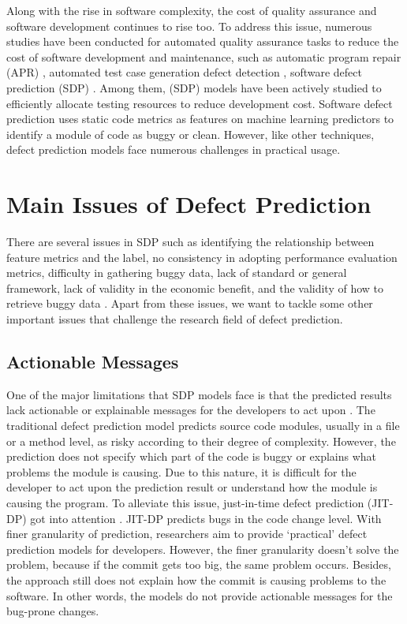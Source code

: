 Along with the rise in software complexity, the cost of quality assurance and software development continues to rise too.
To address this issue, numerous studies have been conducted for automated quality assurance tasks to reduce the cost of software development and maintenance, such as automatic program repair (APR) \cite{kim2013automatic, long2016automatic, mechtaev2016angelix}, automated test case generation \cite{ali2009systematic, anand2013orchestrated, lei2008ipog} defect detection \cite{pradel2012leveraging, pradel2018deepbugs, wang2016bugram}, software defect prediction (SDP) \cite{nam2017heterogeneous, wang2016automatically, zimmermann2009cross}.
Among them, (SDP) models have been actively studied to efficiently allocate testing resources to reduce development cost.
Software defect prediction uses static code metrics as features on machine learning predictors to identify a module of code as buggy or clean. 
However, like other techniques, defect prediction models face numerous challenges in practical usage.

\section{Main Issues of Defect Prediction}
There are several issues in SDP such as identifying the relationship between feature metrics and the label, no consistency in adopting performance evaluation metrics, difficulty in gathering buggy data, lack of standard or general framework, lack of validity in the economic benefit, and the validity of how to retrieve buggy data \cite{arora2015open, herbold2019issues}.
Apart from these issues, we want to tackle some other important issues that challenge the research field of defect prediction.

\subsection{Actionable Messages}
One of the major limitations that SDP models face is that the predicted results lack actionable or explainable messages for the developers to act upon \cite{lewis2013does}.
The traditional defect prediction model predicts source code modules, usually in a file or a method level, as risky according to their degree of complexity.
However, the prediction does not specify which part of the code is buggy or explains what problems the module is causing.
Due to this nature, it is difficult for the developer to act upon the prediction result or understand how the module is causing the program.
To alleviate this issue, just-in-time defect prediction  (JIT-DP) got into attention \cite{kamei2012large}.
JIT-DP predicts bugs in the code change level.
With finer granularity of prediction, researchers aim to provide `practical' defect prediction models for developers.
However, the finer granularity doesn't solve the problem, because if the commit gets too big, the same problem occurs.
Besides, the approach still does not explain how the commit is causing problems to the software.
In other words, the models do not provide actionable messages for the bug-prone changes.

